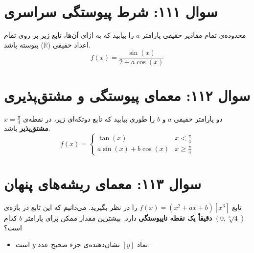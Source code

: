 \documentclass[12pt]{article}
\begin{document}
\vspace{1cm}
\hrulefill
\vspace{1cm}
\section*{سوال ۱۱۱: شرط پیوستگی سراسری}
محدوده‌ی تمام مقادیر حقیقی پارامتر \(a\) را بیابید که به ازای آن‌ها، تابع زیر بر روی تمام اعداد حقیقی (\(\mathbb{R}\)) پیوسته باشد.
\begin{displaymath}
	f(x) = \frac{\sin(x)}{2 + a\cos(x)}
\end{displaymath}

\vspace{1cm}
\hrulefill
\vspace{1cm}

\section*{سوال ۱۱۲: معمای پیوستگی و مشتق‌پذیری}
دو پارامتر حقیقی \(a\) و \(b\) را طوری بیابید که تابع دوتکه‌ای زیر، در نقطه‌ی \(x = \frac{\pi}{4}\) \textbf{مشتق‌پذیر} باشد.
\begin{displaymath}
	f(x) = 
	\begin{cases}
		\tan(x) &  x < \frac{\pi}{4} \\
		a\sin(x) + b\cos(x) &  x \ge \frac{\pi}{4}
	\end{cases}
\end{displaymath}



\vspace{1cm}
\hrulefill
\vspace{1cm}
\section*{سوال ۱۱۳: معمای ریشه‌های پنهان}
تابع \( f(x) = (x^2 + ax + b) [x^3] \) را در نظر بگیرید. می‌دانیم که این تابع در بازه‌ی \( (0, \sqrt[3]{4}) \) \textbf{دقیقاً یک نقطه ناپیوستگی} دارد. بیشترین مقدار ممکن برای پارامتر \(b\) کدام است؟
\begin{itemize}[rightmargin=2cm]
	\item نماد \( [y] \) نشان‌دهنده‌ی جزء صحیح عدد \(y\) است.
\end{itemize}
\end{document}
